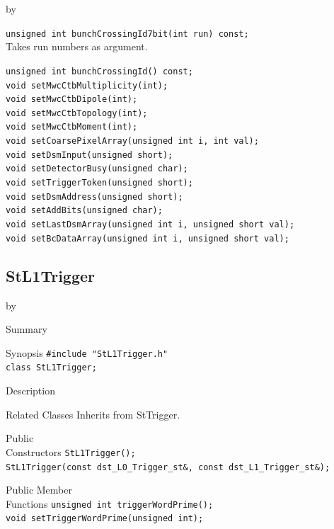 \documentclass[twoside]{article}
\newcommand{\entrylabel}[1]{\mbox{\textbf{{#1}}}\hfil}%
\newenvironment{entry}
{\begin{list}{}%
    {\renewcommand{\makelabel}{\entrylabel}%
     \setlength{\labelwidth}{90pt}%
     \setlength{\leftmargin}{\labelwidth}
     \advance\leftmargin by \labelsep%
      }%
    }%
  {\end{list}}
\newcommand{\Entrylabel}[1]%
{\raisebox{0pt}[1ex][0pt]{\makebox[\labelwidth][l]%
    {\parbox[t]{\labelwidth}{\hspace{0pt}\textbf{{#1}}}}}}
\newenvironment{Entry}%
{\renewcommand{\entrylabel}{\Entrylabel}\begin{entry}}%
  {\end{entry}}
\begin{document}
\begin{Entry}
    \verb+unsigned int bunchCrossingId7bit(int run) const;+\\
    Takes run numbers as argument.
    
    \verb+unsigned int bunchCrossingId() const;+\\

    \verb+void setMwcCtbMultiplicity(int);+\\
    \verb+void setMwcCtbDipole(int);+\\
    \verb+void setMwcCtbTopology(int);+\\
    \verb+void setMwcCtbMoment(int);+\\
    \verb+void setCoarsePixelArray(unsigned int i, int val);+\\
    \verb+void setDsmInput(unsigned short);+\\
    \verb+void setDetectorBusy(unsigned char);+\\ 
    \verb+void setTriggerToken(unsigned short);+\\
    \verb+void setDsmAddress(unsigned short); +\\ 
    \verb+void setAddBits(unsigned char); +\\  
    \verb+void setLastDsmArray(unsigned int i, unsigned short val);+\\
    \verb+void setBcDataArray(unsigned int i, unsigned short val);+\\
\end{Entry}
\clearpage

\subsection{StL1Trigger}
\label{sec:StL1Trigger}
\begin{Entry}
\item[Summary]
\item[Synopsis]
    \verb+#include "StL1Trigger.h"+\\
    \verb+class StL1Trigger;+\\
\item[Description]
\item[Related Classes]
    Inherits from StTrigger.
\item[Public\\ Constructors]
    \verb+StL1Trigger();+\\
    \verb+StL1Trigger(const dst_L0_Trigger_st&, const dst_L1_Trigger_st&);+\\
\item[Public Member\\ Functions]
    \verb+unsigned int triggerWordPrime();+\\
    
    \verb+void setTriggerWordPrime(unsigned int);+\\
\end{Entry}
\clearpage
\end{document}
